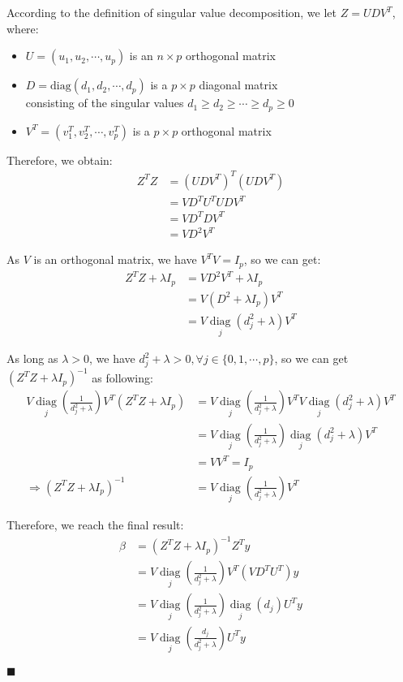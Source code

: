 \documentclass[12pt]{article}
\begin{document}
	According to the definition of singular value decomposition, we let $Z = UDV^T$, where:
	\begin{itemize}
		\item $U = (u_1, u_2, \cdots, u_p)$ is an $n\times p$ orthogonal matrix
		\item $D = \text{diag}(d_1, d_2, \cdots, d_p)$ is a $p\times p$ diagonal matrix \\
		consisting of the singular values $d_1 \geq d_2 \geq \cdots \geq d_p \geq 0$
		\item $V^T = (v_1^T, v_2^T, \cdots, v_p^T)$ is a $p\times p$ orthogonal matrix
	\end{itemize}
	
	Therefore, we obtain:
	\begin{align*}
		Z^T Z &= \left(UDV^T\right)^T\left(UDV^T\right) \\
		&= VD^T U^T UDV^T \\
		&= VD^T DV^T \\
		&= VD^2 V^T
	\end{align*}
	
	As $V$ is an orthogonal matrix, we have $V^T V = I_p$, so we can get:
	\begin{align*}
		Z^T Z + \lambda I_p &= VD^2 V^T + \lambda I_p \\
		&= V\left(D^2 + \lambda I_p\right)V^T \\
		&= V \mathop{\text{diag}}\limits_j\left(d_j^2 + \lambda\right) V^T
	\end{align*}
	
	As long as $\lambda > 0$, we have $d_j^2 + \lambda > 0, \forall j\in\lbrace 0, 1, \cdots,p\rbrace$, so we can get $\left(Z^T Z + \lambda I_p\right)^{-1}$ as following:
	\begin{align*}
		V\mathop{\text{diag}}\limits_j\left(\frac{1}{d_j^2 + \lambda}\right)V^T \left(Z^T Z + \lambda I_p\right) &= 
		V\mathop{\text{diag}}\limits_j\left(\frac{1}{d_j^2 + \lambda}\right)V^T V \mathop{\text{diag}}\limits_j\left(d_j^2 + \lambda\right) V^T \\
		&= V\mathop{\text{diag}}\limits_j\left(\frac{1}{d_j^2 + \lambda}\right)\mathop{\text{diag}}\limits_j\left(d_j^2 + \lambda\right) V^T \\
		&= V V^T = I_p \\
		\Longrightarrow \left(Z^T Z + \lambda I_p\right)^{-1} &=
		V\mathop{\text{diag}}\limits_j\left(\frac{1}{d_j^2 + \lambda}\right)V^T
	\end{align*}
	
	Therefore, we reach the final result:
	\begin{align*}
		\beta &= \left(Z^T Z + \lambda I_p\right)^{-1}Z^T y \\
		&= V\mathop{\text{diag}}\limits_j\left(\frac{1}{d_j^2 + \lambda}\right)V^T \left(VD^T U^T\right) y \\
		&= V\mathop{\text{diag}}\limits_j\left(\frac{1}{d_j^2 + \lambda}\right)\mathop{\text{diag}}\limits_j\left(d_j\right) U^T y \\
		&= V \mathop{\text{diag}}\limits_j\left(\frac{d_j}{d_j^2 + \lambda}\right)U^T y
	\end{align*}
	\begin{flushright}
	$\blacksquare$
	\end{flushright}
\end{document}
